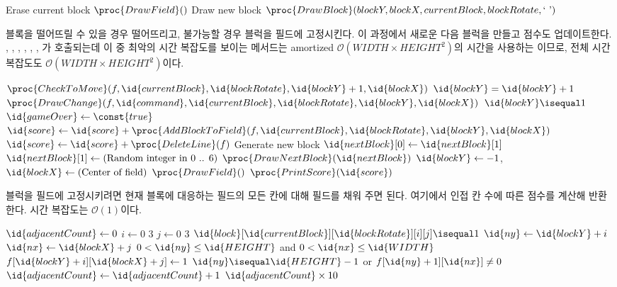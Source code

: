 \begin{codebox}
\li \Comment Erase current block
\li $\proc{DrawField}()$
\li \Comment Draw new block
\li $\proc{DrawBlock}(blockY, blockX, currentBlock, blockRotate, \mbox{` '})$
\end{codebox}

블록을 떨어뜨릴 수 있을 경우 떨어뜨리고, 불가능할 경우 블럭을 필드에 고정시킨다. 이 과정에서 새로운 다음 블럭을 만들고 점수도 업데이트한다.
, , , , ,
, 가 호출되는데 이 중 최악의 시간 복잡도를 보이는 메서드는 amortized $\mathcal{O}\left(WIDTH\times HEIGHT^2\right)$의
시간을 사용하는 이므로, 전체 시간 복잡도도 $\mathcal{O}\left(WIDTH\times HEIGHT^2\right)$이다.

\begin{codebox}
\li \If $\proc{CheckToMove}(f, \id{currentBlock}, \id{blockRotate}, \id{blockY} + 1, \id{blockX})$
\li \Then
        $\id{blockY} = \id{blockY} + 1$
\li     $\proc{DrawChange}(f, \id{command}, \id{currentBlock}, \id{blockRotate}, \id{blockY}, \id{blockX})$
\li \Else
\li     \If $\id{blockY} \isequal 1$
\li     \Then
            $\id{gameOver} \gets \const{true}$
\li     \Else
\li         $\id{score} \gets \id{score} + \proc{AddBlockToField}(f, \id{currentBlock}, \id{blockRotate}, \id{blockY}, \id{blockX})$
\li         $\id{score} \gets \id{score} + \proc{DeleteLine}(f)$
\li         \Comment Generate new block
\li         $\id{nextBlock}[0] \gets \id{nextBlock}[1]$
\li         $\id{nextBlock}[1] \gets (\mbox{Random integer in 0 .. 6})$
\li         $\proc{DrawNextBlock}(\id{nextBlock})$
\li         $\id{blockY} \gets -1$, $\id{blockX} \gets (\mbox{Center of field})$
\li         $\proc{DrawField}()$
\li         $\proc{PrintScore}(\id{score})$
        \End
    \End
\end{codebox}

블럭을 필드에 고정시키려면 현재 블록에 대응하는 필드의 모든 칸에 대해 필드를 채워 주면 된다. 여기에서 인접 칸 수에 따른 점수를 계산해 반환한다.
시간 복잡도는 $\mathcal{O}\left(1\right)$이다.

\begin{codebox}
\li $\id{adjacentCount} \gets 0$
\li \For $i \gets 0$ \To $3$ \Do
\li     \For $j \gets 0$ \To $3$ \Do
\li         \If $\id{block}[\id{currentBlock}][\id{blockRotate}][i][j] \isequal 1$ \Then
\li             $\id{ny} \gets \id{blockY} + i$
\li             $\id{nx} \gets \id{blockX} + j$
\li             \If $0 < \id{ny} \leq \id{HEIGHT}$ and $0 < \id{nx} \leq \id{WIDTH}$ \Then
\li                 $f[\id{blockY} + i][\id{blockX} + j] \gets 1$
\li                 \If $\id{ny}\isequal\id{HEIGHT}-1$ or $f[\id{ny} + 1][\id{nx}] \neq 0$ \Then
\li                     $\id{adjacentCount} \gets \id{adjacentCount} + 1$
                \End
            \End
        \End
    \End
\li \Return $\id{adjacentCount} \times 10$
\end{codebox}

